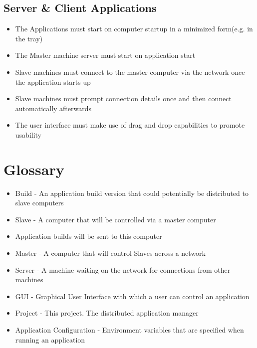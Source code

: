 \documentclass[a4paper,12pt,final]{article}
\begin{document}
\subsection{Server \& Client Applications}
\begin{itemize}
\item The Applications must start on computer startup in a minimized form(e.g. in the tray)
\item The Master machine server must start on application start
\item Slave machines must connect to the master computer via the network once the application starts up
\item Slave machines must prompt connection details once and then connect automatically afterwards
\item The user interface must make use of drag and drop capabilities to promote usability
\end{itemize}

\section{Glossary}
\begin{itemize}
\item Build - An application build version that could potentially be distributed to slave computers
\item Slave - A computer that will be controlled via a master computer
\item Application builds will be sent to this computer
\item Master - A computer that will control Slaves across a network
\item Server - A machine waiting on the network for connections from other machines
\item GUI - Graphical User Interface with which a user can control an application
\item Project - This project. The distributed application manager
\item Application Configuration - Environment variables that are specified when running an application
\end{itemize}
\end{document}
